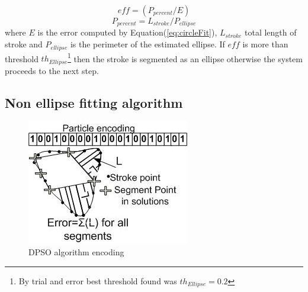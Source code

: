 \documentclass[preprint,1p,times,review]{elsarticle}
\begin{document}
 \begin{equation}
eff= (P_{percent}/E)
\label{eq:circleError}
\end{equation}
 \begin{equation}
P_{percent}  = L_{stroke} /P_{ellipse}
\label{eq:ErrorArea}
\end{equation}
where $E$ is the error computed by Equation(\ref{eq:circleFit}), $L_{stroke}$ total length of stroke and $P_{ellipse} $ is the perimeter of the estimated ellipse. If $eff$ is more than threshold $th_{Ellipse}$\footnote{By trial and error best threshold found was $th_{Ellipse}=0.2$} then the stroke is segmented as an ellipse otherwise the system proceeds to the next step.

\subsection{Non ellipse fitting algorithm}
\label{subsubsec:Discreteparticleswarmalgorithm}
\begin{figure}
	\centering

	 \includegraphics[scale=0.7]{pso1.jpg}
	\caption{DPSO algorithm encoding}
	\label{fig:pso1}
\end{figure}
\end{document}
